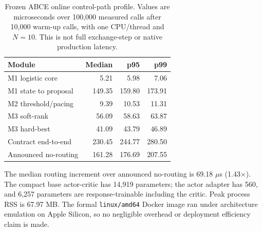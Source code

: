 \begin{table}[t]
\centering
\caption{Frozen ABCE online control-path profile. Values are microseconds over
100,000 measured calls after 10,000 warm-up calls, with one CPU/thread and
$N=10$. This is not full exchange-step or native production latency.}
\label{tab:efficiency-profile}
\footnotesize
\setlength{\tabcolsep}{2.8pt}
\begin{tabular}{lrrr}
\toprule
Module & Median & p95 & p99 \\
\midrule
M1 logistic core & 5.21 & 5.98 & 7.06 \\
M1 state to proposal & 149.35 & 159.80 & 173.91 \\
M2 threshold/pacing & 9.39 & 10.53 & 11.31 \\
M3 soft-rank & 56.09 & 58.63 & 63.87 \\
M3 hard-best & 41.09 & 43.79 & 46.89 \\
Contract end-to-end & 230.45 & 244.77 & 280.50 \\
Announced no-routing & 161.28 & 176.69 & 207.55 \\
\bottomrule
\end{tabular}
\vspace{2pt}
\parbox{0.98\columnwidth}{\scriptsize
The median routing increment over announced no-routing is 69.18 $\mu$s
(1.43$\times$). The compact base actor-critic has 14,919 parameters; the actor
adapter has 560, and 6,257 parameters are response-trainable including the
critic. Peak process RSS is 67.97 MB. The formal \texttt{linux/amd64} Docker
image ran under architecture emulation on Apple Silicon, so no negligible
overhead or deployment efficiency claim is made.}
\end{table}
